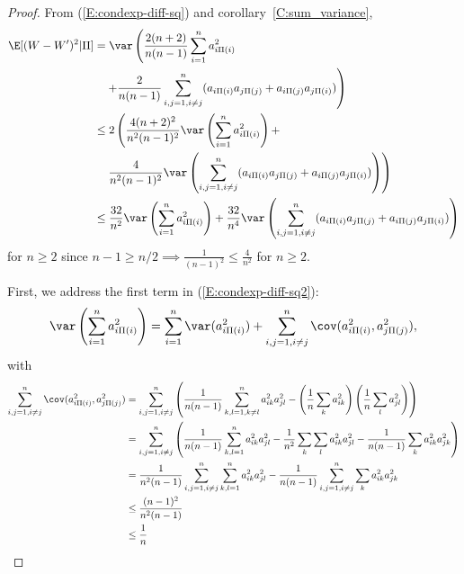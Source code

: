 \begin{proof}
  From (\ref{E:condexp-diff-sq}) and corollary~\ref{C:sum_variance},
  \begin{equation}
    \label{E:condexp-diff-sq2}
    \begin{split}
      \E [(W-W')^2 | \Pi] &= \var \left ( \frac{2(n+2)}{n(n-1)}\sum_{i=1}^n a_{i \Pi(i)}^2
      \right . \\
      &\quad \left . + \frac{2}{n(n-1)}\sum_{i,j=1, i\neq j}^n (a_{i\Pi(i)}a_{j\Pi(j)} +
        a_{i\Pi(j)}a_{j\Pi(i)}) \right ) \\
      &\leq 2 \left ( \frac{4(n+2)^2}{n^2(n-1)^2} \var \left ( \sum_{i=1}^n a_{i \Pi(i)}^2
        \right ) + \right . \\
      &\quad \left .\frac{4}{n^2(n-1)^2} \var \left ( \sum_{i,j=1, i\neq j}^n (a_{i\Pi(i)}a_{j\Pi(j)} +
          a_{i\Pi(j)}a_{j\Pi(i)}) \right ) \right ) \\
      &\leq \frac{32}{n^2}\var \left ( \sum_{i=1}^n a_{i \Pi(i)}^2 \right ) +
      \frac{32}{n^4} \var \left ( \sum_{i,j=1, i\neq j}^n (a_{i\Pi(i)}a_{j\Pi(j)} +
        a_{i\Pi(j)}a_{j\Pi(i)}) \right )
    \end{split}
  \end{equation}
  for $n \geq 2$ since $n-1 \geq n/2 \implies \frac{1}{(n-1)^2} \leq \frac{4}{n^2}$ for $n \geq 2$.

  First, we address the first term in (\ref{E:condexp-diff-sq2}):
  \begin{equation*}
    \var \left ( \sum_{i=1}^n a_{i \Pi(i)}^2 \right ) = \sum_{i=1}^n \var(a_{i \Pi(i)}^2) +
    \sum_{i,j=1, i\neq j}^n \cov(a_{i \Pi(i)}^2, a_{j \Pi(j)}^2),
  \end{equation*}
  with
  \begin{align*}
    \sum_{i,j=1, i\neq j}^n \cov(a_{i \Pi(i)}^2, a_{j \Pi(j)}^2)
    &= \sum_{i,j=1, i\neq j}^n \left ( \frac{1}{n(n-1)} \sum_{k,l=1, k\neq l}^n a_{ik}^2 a_{jl}^2 -
      \left ( \frac{1}{n} \sum_k a_{ik}^2 \right ) \left ( \frac{1}{n} \sum_l a_{jl}^2 \right )
    \right ) \\
    &= \sum_{i,j=1, i\neq j}^n \left ( \frac{1}{n(n-1)} \sum_{k,l=1}^n a_{ik}^2 a_{jl}^2
      - \frac{1}{n^2} \sum_k \sum_l a_{ik}^2 a_{jl}^2
      - \frac{1}{n(n-1)} \sum_k a_{ik}^2 a_{jk}^2 \right ) \\
    &= \frac{1}{n^2(n-1)} \sum_{i,j=1, i\neq j}^n \sum_{k,l=1}^n a_{ik}^2 a_{jl}^2
    - \frac{1}{n(n-1)} \sum_{i,j=1, i\neq j}^n \sum_k a_{ik}^2 a_{jk}^2 \\
    &\leq \frac{(n-1)^2}{n^2(n-1)} \\
    &\leq \frac{1}{n}
  \end{align*}


\end{proof}
